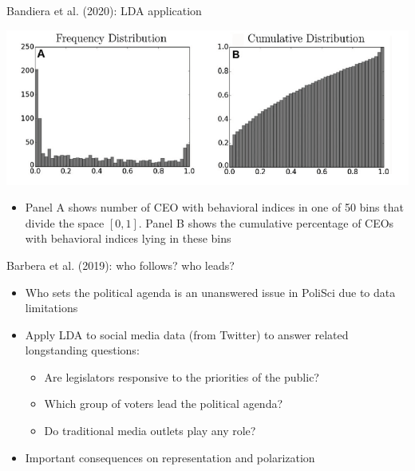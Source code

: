\documentclass[english]{beamer}
\begin{document}
\begin{frame}{Bandiera et al. (2020): LDA application}
\vspace{-7pt}
\begin{center}

\includegraphics[scale=0.5]{Images/bandiera2017c.png}
\end{center}
\begin{itemize}
    \item Panel A shows number of CEO with behavioral indices in one of 50 bins that divide the space $[0,1]$. Panel B shows the cumulative percentage of CEOs with behavioral indices lying in these bins
\end{itemize}
\end{frame}

\begin{frame}{Barbera et al. (2019): who follows? who leads?}
    \begin{itemize}\setlength{\itemsep}{1.5em}
    \item Who sets the political agenda is an unanswered issue in PoliSci due to data limitations
    \item Apply LDA to social media data (from Twitter) to answer related longstanding questions:
    \begin{itemize}\setlength{\itemsep}{1em}\vspace{5pt}
        \item Are legislators responsive to the priorities of the public?
        \item Which group of voters lead the political agenda?
        \item Do traditional media outlets play any role?
    \end{itemize}
    \item Important consequences on representation and polarization
    \end{itemize}
\end{frame}
\end{document}
